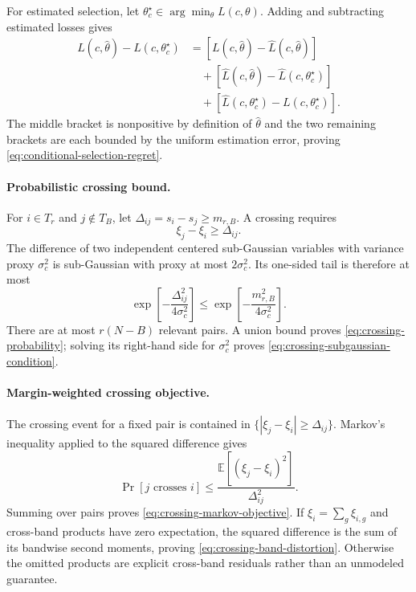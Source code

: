 For estimated selection, let
$\theta_c^\star\in\arg\min_\theta L(c,\theta)$.  Adding and subtracting
estimated losses gives
\begin{align}
 L(c,\widehat\theta)-L(c,\theta_c^\star)
 &=
 [L(c,\widehat\theta)-\widehat L(c,\widehat\theta)]\\
 &\quad+
 [\widehat L(c,\widehat\theta)
  -\widehat L(c,\theta_c^\star)]\\
 &\quad+
 [\widehat L(c,\theta_c^\star)-L(c,\theta_c^\star)].
\end{align}
The middle bracket is nonpositive by definition of $\widehat\theta$ and
the two remaining brackets are each bounded by the uniform estimation
error, proving \cref{eq:conditional-selection-regret}.

\paragraph{Probabilistic crossing bound.}
For $i\in T_r$ and $j\notin T_B$, let
$\Delta_{ij}=s_i-s_j\ge m_{r,B}$.  A crossing requires
\begin{equation}
 \xi_j-\xi_i\ge\Delta_{ij}.
\end{equation}
The difference of two independent centered sub-Gaussian variables with
variance proxy $\sigma_c^2$ is sub-Gaussian with proxy at most
$2\sigma_c^2$.  Its one-sided tail is therefore at most
\begin{equation}
 \exp\!\left[-\frac{\Delta_{ij}^2}{4\sigma_c^2}\right]
 \le
 \exp\!\left[-\frac{m_{r,B}^2}{4\sigma_c^2}\right].
\end{equation}
There are at most $r(N-B)$ relevant pairs.  A union bound proves
\cref{eq:crossing-probability}; solving its right-hand side for
$\sigma_c^2$ proves \cref{eq:crossing-subgaussian-condition}.

\paragraph{Margin-weighted crossing objective.}
The crossing event for a fixed pair is contained in
$\{|\xi_j-\xi_i|\ge\Delta_{ij}\}$.  Markov's inequality applied to the
squared difference gives
\begin{equation}
 \Pr[j\text{ crosses }i]
 \le
 \frac{\mathbb E[(\xi_j-\xi_i)^2]}{\Delta_{ij}^2}.
\end{equation}
Summing over pairs proves \cref{eq:crossing-markov-objective}.  If
$\xi_i=\sum_g\xi_{i,g}$ and cross-band products have zero expectation, the
squared difference is the sum of its bandwise second moments, proving
\cref{eq:crossing-band-distortion}.  Otherwise the omitted products are
explicit cross-band residuals rather than an unmodeled guarantee.

